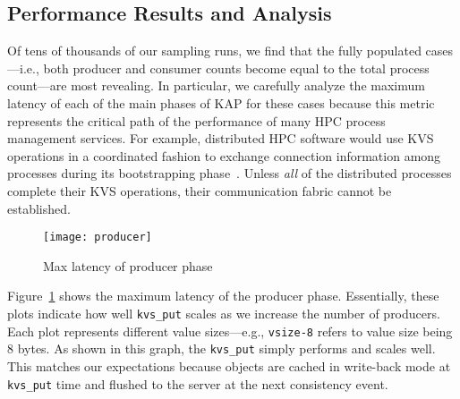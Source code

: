 \subsection{Performance Results and Analysis}
\label{results}
Of tens of thousands of our sampling runs, we find that the fully populated
cases---i.e., both producer and consumer counts become equal to the total
process count---are most revealing. In particular, we carefully analyze 
the maximum latency of each of the main phases of KAP for these cases 
because this metric represents the critical path of the performance of
many HPC process management services. For example, distributed 
HPC software would use KVS operations in a coordinated fashion to exchange 
connection information among processes during its bootstrapping 
phase~\cite{LIBI,PMI2}. Unless {\em all} 
of the distributed processes complete their
KVS operations, their communication fabric cannot be established. 

\begin{figure}
  \centering
  \texttt{[image: producer]}
  \caption{Max latency of producer phase}
  \label{fig:prod}
\end{figure}

Figure~\ref{fig:prod} shows the maximum latency of the producer phase.
Essentially, these plots indicate how well {\tt kvs\_put}
scales as we increase the number of producers. Each plot represents
different value sizes---e.g., {\tt vsize-8} refers to value size being
8 bytes. As shown in this graph, the {\tt kvs\_put} simply performs and
scales well. This matches our expectations because objects
are cached in write-back mode at {\tt kvs\_put} time and flushed to the
server at the next consistency event. 

%
%

